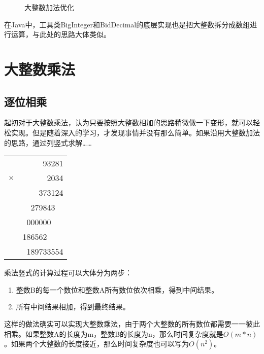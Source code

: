 \begin{figure}[H]
	\centering
	\caption{大整数加法优化}
\end{figure}

在Java中，工具类BigInteger和BidDecimal的底层实现也是把大整数拆分成数组进行运算，与此处的思路大体类似。

\newpage

\section{大整数乘法}

\subsection{逐位相乘}

起初对于大整数乘法，认为只要按照大整数相加的思路稍微做一下变形，就可以轻松实现。但是随着深入的学习，才发现事情并没有那么简单。如果沿用大整数加法的思路，通过列竖式求解……

\begin{table}[H]
	\centering
	\begin{tabular}{cD{.}{.}{3}}
		           & 93281         \\
		$ \times $ & 2034          \\
		\hline
		           & 373124        \\
		           & 279843\ \     \\
		           & 000000\ \ \   \\
		           & 186562\ \ \ \ \\
		\hline
		           & 189733554
	\end{tabular}
\end{table}

乘法竖式的计算过程可以大体分为两步：

\begin{enumerate}
	\item 整数B的每一个数位和整数A所有数位依次相乘，得到中间结果。
	\item 所有中间结果相加，得到最终结果。
\end{enumerate}

这样的做法确实可以实现大整数乘法，由于两个大整数的所有数位都需要一一彼此相乘。如果整数A的长度为m，整数B的长度为n，那么时间复杂度就是$ O(m * n) $。如果两个大整数的长度接近，那么时间复杂度也可以写为$ O(n^2) $。\\

